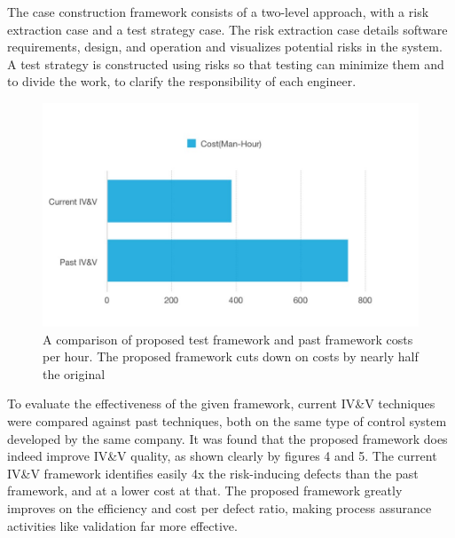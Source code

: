 \documentclass[journal, onecolumn]{IEEEtran}
\begin{document}
	The case construction framework consists of a two-level approach, with a risk extraction case and a test strategy case. The risk extraction case details software requirements, design, and operation and visualizes potential risks in the system. 
	\newline \newline
	A test strategy is constructed using risks so that testing can minimize them and to divide the work, to clarify the responsibility of each engineer.
	
	\begin{figure}[H]
		\includegraphics[scale=0.5]{ivv-hourly2.jpeg}
		\centering
		\caption{A comparison of proposed test framework and past framework costs per hour. The proposed framework cuts down on costs by nearly half the original}
	\end{figure}
	
	To evaluate the effectiveness of the given framework, current IV\&V techniques were compared against past techniques, both on the same type of control system developed by the same company. It was found that the proposed framework does indeed improve IV\&V quality, as shown clearly by figures 4 and 5. 
	\newline \newline
	The current IV\&V framework identifies easily 4x the risk-inducing defects than the past framework, and at a lower cost at that. The proposed framework greatly improves on the efficiency and cost per defect ratio, making process assurance activities like validation far more effective.
	
\end{document}
